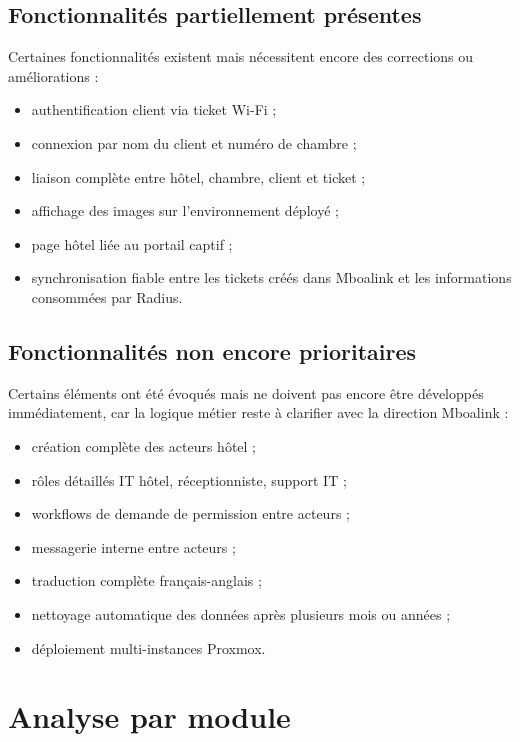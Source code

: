 \documentclass[12pt,a4paper]{article}
\begin{document}
\subsection{Fonctionnalités partiellement présentes}

Certaines fonctionnalités existent mais nécessitent encore des corrections ou améliorations :

\begin{itemize}
  \item authentification client via ticket Wi-Fi ;
  \item connexion par nom du client et numéro de chambre ;
  \item liaison complète entre hôtel, chambre, client et ticket ;
  \item affichage des images sur l'environnement déployé ;
  \item page hôtel liée au portail captif ;
  \item synchronisation fiable entre les tickets créés dans Mboalink et les informations consommées par Radius.
\end{itemize}

\subsection{Fonctionnalités non encore prioritaires}

Certains éléments ont été évoqués mais ne doivent pas encore être développés immédiatement, car la logique métier reste à clarifier avec la direction Mboalink :

\begin{itemize}
  \item création complète des acteurs hôtel ;
  \item rôles détaillés IT hôtel, réceptionniste, support IT ;
  \item workflows de demande de permission entre acteurs ;
  \item messagerie interne entre acteurs ;
  \item traduction complète français-anglais ;
  \item nettoyage automatique des données après plusieurs mois ou années ;
  \item déploiement multi-instances Proxmox.
\end{itemize}

\section{Analyse par module}
\end{document}
